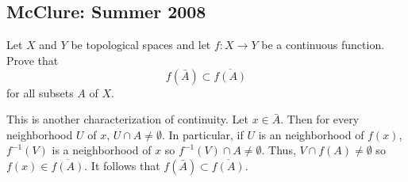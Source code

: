\subsection{McClure: Summer 2008}
\setcounter{exercise}{0}
\setcounter{equation}{0}

\begin{problem}
  Let \(X\) and \(Y\) be topological spaces and let \(f\colon X\to Y\) be a
  continuous function. Prove that
  \[
    f(\bar A)\subset\overline{f(A)}
  \]
  for all subsets \(A\) of \(X\).
\end{problem}
\begin{solution}
  This is another characterization of continuity. Let \(x\in\bar A\). Then
  for every neighborhood \(U\) of \(x\), \(U\cap A\neq\emptyset\). In
  particular, if \(U\) is an neighborhood of \(f(x)\), \(f^{-1}(V)\)
  is a neighborhood of \(x\) so \(f^{-1}(V)\cap A\neq\emptyset\). Thus,
  \(V\cap f(A)\neq\emptyset\) so \(f(x)\in\overline{f(A)}\). It follows
  that \(f(\bar A)\subset\overline{f(A)}\).
\end{solution}

